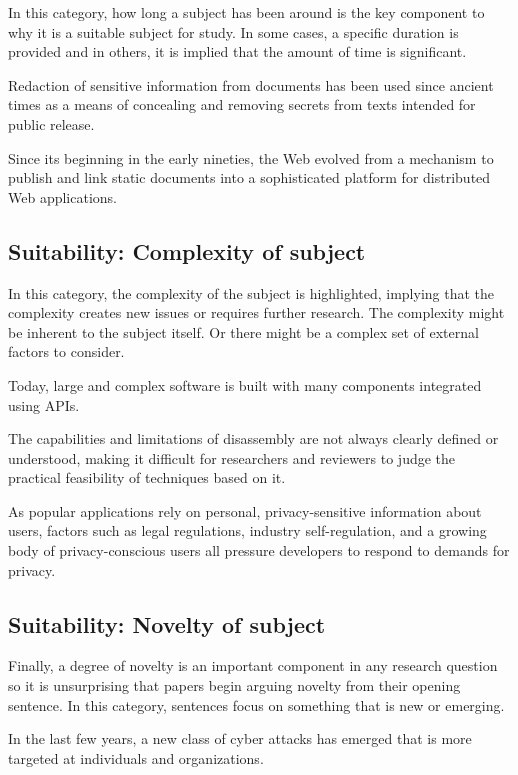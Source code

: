 \documentclass[sigconf]{acmart}
\begin{document}
	In this category, how long a subject has been around is the key component to why it is a suitable subject for study. In some cases, a specific duration is provided and in others, it is implied that the amount of time is significant.
	
	Redaction of sensitive information from documents has been used since ancient times as a means of concealing and removing secrets from texts intended for public release.
	
	Since its beginning in the early nineties, the Web evolved from a mechanism to publish and link static documents into a sophisticated platform for distributed Web applications.
	
\subsection{Suitability: Complexity of subject}
	
	In this category, the complexity of the subject is highlighted, implying that the complexity creates new issues or requires further research. The complexity might be inherent to the subject itself. Or there might be a complex set of external factors to consider.
	
	Today, large and complex software is built with many components integrated using APIs.
	
	The capabilities and limitations of disassembly are not always clearly defined or understood, making it difficult for researchers and reviewers to judge the practical feasibility of techniques based on it.
	
	As popular applications rely on personal, privacy-sensitive information about users, factors such as legal regulations, industry self-regulation, and a growing body of privacy-conscious users all pressure developers to respond to demands for privacy.
	
\subsection{Suitability: Novelty of subject}
	
	Finally, a degree of novelty is an important component in any research question so it is unsurprising that papers begin arguing novelty from their opening sentence. In this category, sentences focus on something that is new or emerging. 
	
	In the last few years, a new class of cyber attacks has emerged that is more targeted at individuals and organizations.
	
\end{document}

